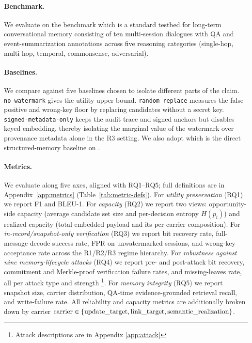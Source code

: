 \paragraph{Benchmark.}
We evaluate on the \locomo{} benchmark \cite{maharana-etal-2024-evaluating} which is a standard testbed for long-term conversational memory consisting of ten multi-session dialogues with QA and event-summarization annotations across five reasoning categories (single-hop, multi-hop, temporal, commonsense, adversarial).


\paragraph{Baselines.}
We compare against five baselines chosen to isolate different parts of
the claim. \texttt{no-watermark} gives the utility upper bound.
\texttt{random-replace} measures the false-positive and wrong-key
floor by replacing candidates without a secret key.
\texttt{signed-metadata-only} keeps the audit trace and signed anchors
but disables keyed embedding, thereby isolating the marginal value of
the watermark over provenance metadata alone in the R3 setting.
We also adopt \kgmark{} \cite{kgmark} which is the direct structured-memory baseline on \graphiti{}. 

\paragraph{Metrics.}
We evaluate along five axes, aligned with RQ1--RQ5; full definitions are in Appendix~\ref{app:metrics} (Table~\ref{tab:metric-defs}). For \emph{utility preservation} (RQ1) we report \locomo{} F1 and BLEU-1. For \emph{capacity} (RQ2) we report two views: opportunity-side capacity (average candidate set size and per-decision entropy $H(p_t)$) and realized capacity (total embedded payload and its per-carrier composition). For \emph{in-record/snapshot-only verification} (RQ3) we report bit recovery rate, full-message decode success rate, FPR on unwatermarked sessions, and wrong-key acceptance rate across the R1/R2/R3 regime hierarchy. For \emph{robustness against nine memory-lifecycle attacks} (RQ4) we report pre- and post-attack bit recovery, commitment and Merkle-proof verification failure rates, and missing-leaves rate, all per attack type and strength \footnote{Attack descriptions are in Appendix \ref{app:attack}}. For \emph{memory integrity} (RQ5) we report snapshot size, carrier distribution, QA-time evidence-grounded retrieval recall, and write-failure rate. All reliability and capacity metrics are additionally broken down by carrier $\mathrm{carrier} \in \{\text{update\_target}, \text{link\_target}, \text{semantic\_realization}\}$. %



